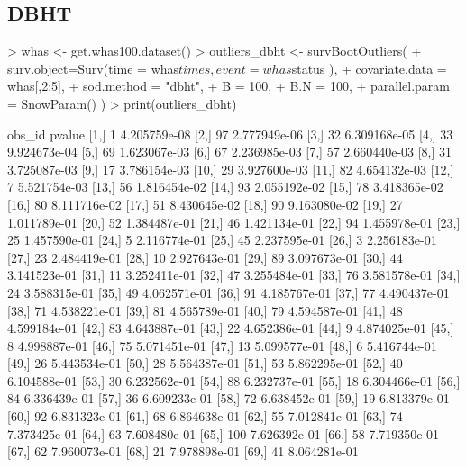 \documentclass{article}
\begin{document}
\subsection{DBHT}

\begin{Schunk}
\begin{Sinput}
> whas <- get.whas100.dataset()
> outliers_dbht <- survBootOutliers( 
+     surv.object=Surv(time = whas$times,event = whas$status ),
+     covariate.data = whas[,2:5],
+     sod.method = "dbht",
+     B = 100,
+     B.N = 100,
+     parallel.param = SnowParam() )
> print(outliers_dbht)
\end{Sinput}
\begin{Soutput}
       obs_id       pvalue
  [1,]      1 4.205759e-08
  [2,]     97 2.777949e-06
  [3,]     32 6.309168e-05
  [4,]     33 9.924673e-04
  [5,]     69 1.623067e-03
  [6,]     67 2.236985e-03
  [7,]     57 2.660440e-03
  [8,]     31 3.725087e-03
  [9,]     17 3.786154e-03
 [10,]     29 3.927600e-03
 [11,]     82 4.654132e-03
 [12,]      7 5.521754e-03
 [13,]     56 1.816454e-02
 [14,]     93 2.055192e-02
 [15,]     78 3.418365e-02
 [16,]     80 8.111716e-02
 [17,]     51 8.430645e-02
 [18,]     90 9.163080e-02
 [19,]     27 1.011789e-01
 [20,]     52 1.384487e-01
 [21,]     46 1.421134e-01
 [22,]     94 1.455978e-01
 [23,]     25 1.457590e-01
 [24,]      5 2.116774e-01
 [25,]     45 2.237595e-01
 [26,]      3 2.256183e-01
 [27,]     23 2.484419e-01
 [28,]     10 2.927643e-01
 [29,]     89 3.097673e-01
 [30,]     44 3.141523e-01
 [31,]     11 3.252411e-01
 [32,]     47 3.255484e-01
 [33,]     76 3.581578e-01
 [34,]     24 3.588315e-01
 [35,]     49 4.062571e-01
 [36,]     91 4.185767e-01
 [37,]     77 4.490437e-01
 [38,]     71 4.538221e-01
 [39,]     81 4.565789e-01
 [40,]     79 4.594587e-01
 [41,]     48 4.599184e-01
 [42,]     83 4.643887e-01
 [43,]     22 4.652386e-01
 [44,]      9 4.874025e-01
 [45,]      8 4.998887e-01
 [46,]     75 5.071451e-01
 [47,]     13 5.099577e-01
 [48,]      6 5.416744e-01
 [49,]     26 5.443534e-01
 [50,]     28 5.564387e-01
 [51,]     53 5.862295e-01
 [52,]     40 6.104588e-01
 [53,]     30 6.232562e-01
 [54,]     88 6.232737e-01
 [55,]     18 6.304466e-01
 [56,]     84 6.336439e-01
 [57,]     36 6.609233e-01
 [58,]     72 6.638452e-01
 [59,]     19 6.813379e-01
 [60,]     92 6.831323e-01
 [61,]     68 6.864638e-01
 [62,]     55 7.012841e-01
 [63,]     74 7.373425e-01
 [64,]     63 7.608480e-01
 [65,]    100 7.626392e-01
 [66,]     58 7.719350e-01
 [67,]     62 7.960073e-01
 [68,]     21 7.978898e-01
 [69,]     41 8.064281e-01

\end{Soutput}
\end{Schunk}
\end{document}
